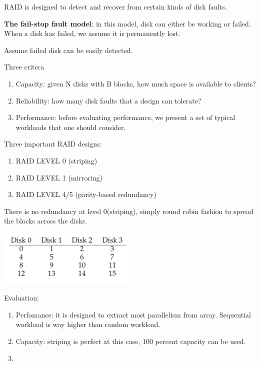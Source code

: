 
        RAID is designed to detect and recover from certain kinds of disk faults.

        \textbf{The fail-stop fault model}: in this model, disk can either be 
        working or failed.  When a disk has failed, we assume it is permanently lost.

        Assume failed disk can be easily detected.


        Three critera
        \begin{enumerate}
            \item Capacity: given N disks with B blocks, how much space is available to clients?
            \item Reliability: how many disk faults that a design can tolerate?
            \item Performance: before evaluating performance, we present a set of typical workloads 
            that one should consider.
        \end{enumerate}

        Three important RAID designs:
        \begin{enumerate}
            \item RAID LEVEL 0 (striping)
            \item RAID LEVEL 1 (mirroring)
            \item RAID LEVEL 4/5 (parity-based redundancy)
        \end{enumerate}


        There is no redundancy at level 0(striping), simply round robin fashion to spread 
        the blocks across the disks.

        \includegraphics[width=0.5\textwidth]{chapters/Persistence/persistence/level_0.png}

        Evaluation:

        \begin{enumerate}
            \item Perfomance: it is designed to extract most parallelism from array. Sequential workload 
            is way higher than random workload.
            \item Capacity: striping is perfect at this case, 100 percent capacity can be used.
            \item 
        \end{enumerate}

